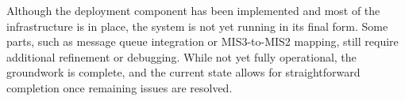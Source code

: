 Although the deployment component has been implemented and most of the infrastructure is in place, the system is not yet running in its final form. Some parts, such as message queue integration or MIS3-to-MIS2 mapping, still require additional refinement or debugging. While not yet fully operational, the groundwork is complete, and the current state allows for straightforward completion once remaining issues are resolved.


